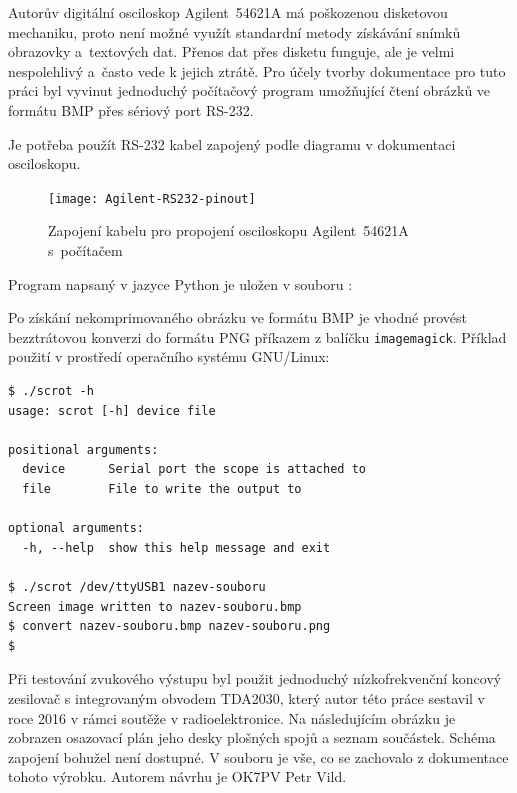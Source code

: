 \clearpage
{}
Autorův digitální osciloskop Agilent~54621A má poškozenou disketovou mechaniku,
proto není možné využít standardní metody získávání snímků obrazovky
a~textových dat. Přenos dat přes disketu funguje, ale je velmi nespolehlivý
a~často vede k jejich ztrátě. Pro účely tvorby dokumentace pro tuto práci byl
vyvinut jednoduchý počítačový program umožňující čtení obrázků ve formátu BMP
přes sériový port RS-232.

Je potřeba použít RS-232 kabel zapojený podle diagramu v dokumentaci
osciloskopu.

\begin{figure}[htbp]
    \centering
    \texttt{[image: Agilent-RS232-pinout]}
    \caption{%
        Zapojení kabelu pro propojení osciloskopu Agilent~54621A
        s~počítačem~\cite{Agilent54621Auser}
    }
    \label{fig:agilent RS232 pinout}
\end{figure}

Program napsaný v jazyce Python je uložen v souboru :


Po získání nekomprimovaného obrázku ve formátu BMP je vhodné provést
bezztrátovou konverzi do formátu PNG příkazem  z balíčku
\texttt{imagemagick}.
Příklad použití v prostředí operačního systému GNU/Linux:
\begin{lstlisting}[style=terminal]
$ ./scrot -h
usage: scrot [-h] device file

positional arguments:
  device      Serial port the scope is attached to
  file        File to write the output to

optional arguments:
  -h, --help  show this help message and exit

$ ./scrot /dev/ttyUSB1 nazev-souboru
Screen image written to nazev-souboru.bmp
$ convert nazev-souboru.bmp nazev-souboru.png
$
\end{lstlisting}




\clearpage
{}
\label{app:TDA2030}
Při testování zvukového výstupu byl použit jednoduchý nízkofrekvenční koncový
zesilovač s integrovaným obvodem TDA2030, který autor této práce sestavil
v roce 2016 v rámci soutěže v radioelektronice. Na následujícím obrázku je
zobrazen osazovací plán jeho desky plošných spojů a seznam součástek. Schéma
zapojení bohužel není dostupné.
V souboru  je vše, co se zachovalo
z dokumentace tohoto výrobku. Autorem návrhu je OK7PV Petr Vild.

